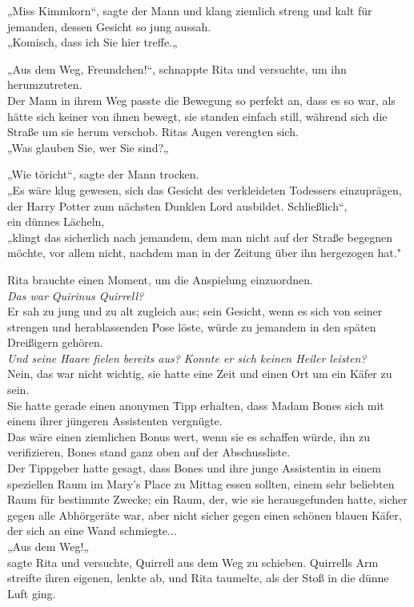 {„Miss Kimmkorn“, sagte der Mann und klang ziemlich streng und kalt für jemanden, dessen Gesicht so jung aussah.\\ „Komisch, dass ich Sie hier treffe.„

„Aus dem Weg, Freundchen!“, schnappte Rita und versuchte, um ihn herumzutreten.\\ Der Mann in ihrem Weg passte die Bewegung so perfekt an, dass es so war, als hätte sich keiner von ihnen bewegt, sie standen einfach still, während sich die Straße um sie herum verschob. Ritas Augen verengten sich.\\ „Was glauben Sie, wer Sie sind?„

„Wie töricht“, sagte der Mann trocken.\\ „Es wäre klug gewesen, sich das Gesicht des verkleideten Todessers einzuprägen, der Harry Potter zum nächsten Dunklen Lord ausbildet. Schließlich“,\\ ein dünnes Lächeln,\\ „klingt das sicherlich nach jemandem, dem man nicht auf der Straße begegnen möchte, vor allem nicht, nachdem man in der Zeitung über ihn hergezogen hat."

Rita brauchte einen Moment, um die Anspielung einzuordnen.\\ \emph{Das war Quirinus Quirrell?}\\ Er sah zu jung und zu alt zugleich aus; sein Gesicht, wenn es sich von seiner strengen und herablassenden Pose löste, würde zu jemandem in den späten Dreißigern gehören.\\ \emph{Und seine Haare fielen bereits aus? Konnte er sich keinen Heiler leisten?}\\ Nein, das war nicht wichtig, sie hatte eine Zeit und einen Ort um ein Käfer zu sein.\\ Sie hatte gerade einen anonymen Tipp erhalten, dass Madam Bones sich mit einem ihrer jüngeren Assistenten vergnügte.\\ Das wäre einen ziemlichen Bonus wert, wenn sie es schaffen würde, ihn zu verifizieren, Bones stand ganz oben auf der Abschussliste.\\ Der Tippgeber hatte gesagt, dass Bones und ihre junge Assistentin in einem speziellen Raum im Mary's Place zu Mittag essen sollten, einem sehr beliebten Raum für bestimmte Zwecke; ein Raum, der, wie sie herausgefunden hatte, sicher gegen alle Abhörgeräte war, aber nicht sicher gegen einen schönen blauen Käfer, der sich an eine Wand schmiegte...\\ „Aus dem Weg!„\\ sagte Rita und versuchte, Quirrell aus dem Weg zu schieben. Quirrells Arm streifte ihren eigenen, lenkte ab, und Rita taumelte, als der Stoß in die dünne Luft ging.

}
